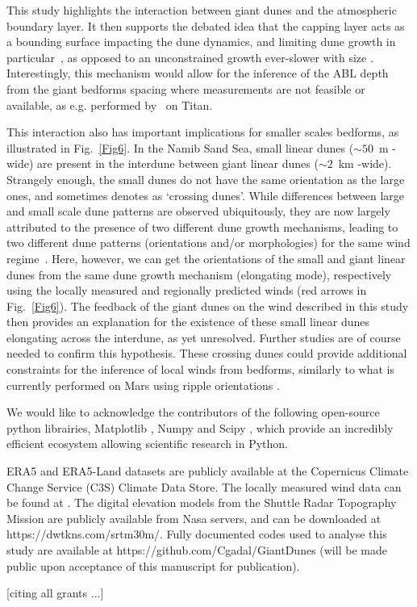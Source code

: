 This study highlights the interaction between giant dunes and the atmospheric boundary layer. It then supports the debated idea that the capping layer acts as a bounding surface impacting the dune dynamics, and limiting dune growth in particular~\citep{andreotti2009}, as opposed to an unconstrained growth ever-slower with size \citep{Eastwood2011, gunn2021}. Interestingly, this mechanism would allow for the inference of the ABL depth from the giant bedforms spacing where measurements are not feasible or available, as e.g. performed by~\citet{Lorenz2010} on Titan.

This interaction also has important implications for smaller scales bedforms, as illustrated in Fig.~\ref{Fig6}. In the Namib Sand Sea, small linear dunes ($\sim50$~m -wide) are present in the interdune between giant linear dunes ($\sim2$~km -wide). Strangely enough, the small dunes do not have the same orientation as the large ones, and sometimes denotes as `crossing dunes'. While differences between large and small scale dune patterns are observed ubiquitously, they are now largely attributed to the presence of two different dune growth mechanisms, leading to two different dune patterns (orientations and/or morphologies) for the same wind regime~\citep{Courrech2014, Runyon2017, lu2017, Song2019, Gadal2020, Hu2021}. Here, however, we can get the orientations of the small and giant linear dunes from the same dune growth mechanism (elongating mode), respectively using the locally measured and regionally predicted winds (red arrows in Fig.~\ref{Fig6}). The feedback of the giant dunes on the wind described in this study then provides an explanation for the existence of these small linear dunes elongating across the interdune, as yet unresolved. Further studies are of course needed to confirm this hypothesis. These crossing dunes could provide additional constraints for the inference of local winds from bedforms, similarly to what is currently performed on Mars using ripple orientations \citep{Liu2015, Hood2021}.


\begin{acknowledgements}
We would like to acknowledge the contributors of the following open-source python librairies, Matplotlib \citep{Hunter2007}, Numpy \citep{Harris2020} and Scipy \citep{Virtanen2020}, which provide an incredibly efficient ecosystem allowing scientific research in Python.

ERA5 and ERA5-Land datasets are publicly available at the Copernicus Climate Change Service (C3S) Climate Data Store. The locally measured wind data can be found at . The digital elevation models from the Shuttle Radar Topography Mission are publicly available from Nasa servers, and can be downloaded at https://dwtkns.com/srtm30m/. Fully documented codes used to analyse this study are available at https://github.com/Cgadal/GiantDunes (will be made public upon acceptance of this manuscript for publication).

[citing all grants ...] 
\end{acknowledgements}


